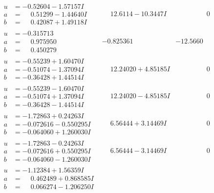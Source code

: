 \documentclass[1p]{elsarticle_modified}
\theoremstyle{definition}
\begin{document}
$$\begin{array}{c|c|c}
\begin{aligned}
u &= -0.52604 - 1.57157 I \\
a &= \phantom{-}0.51299 - 1.44640 I \\
b &= \phantom{-}0.42087 + 1.49118 I\end{aligned}
 & \phantom{-}12.6114 - 10.3447 I & \phantom{-0.000000 } 0 \\ \hline\begin{aligned}
u &= -0.315713\phantom{ +0.000000I} \\
a &= \phantom{-}0.975950\phantom{ +0.000000I} \\
b &= \phantom{-}0.450279\phantom{ +0.000000I}\end{aligned}
 & -0.825361\phantom{ +0.000000I} & -12.5660\phantom{ +0.000000I} \\ \hline\begin{aligned}
u &= -0.55239 + 1.60470 I \\
a &= -0.51074 - 1.37094 I \\
b &= -0.36428 + 1.44514 I\end{aligned}
 & \phantom{-}12.24020 + 4.85185 I & \phantom{-0.000000 } 0 \\ \hline\begin{aligned}
u &= -0.55239 - 1.60470 I \\
a &= -0.51074 + 1.37094 I \\
b &= -0.36428 - 1.44514 I\end{aligned}
 & \phantom{-}12.24020 - 4.85185 I & \phantom{-0.000000 } 0 \\ \hline\begin{aligned}
u &= -1.72863 + 0.24263 I \\
a &= -0.072616 - 0.550295 I \\
b &= -0.064060 + 1.260030 I\end{aligned}
 & \phantom{-}6.56444 + 3.14469 I & \phantom{-0.000000 } 0 \\ \hline\begin{aligned}
u &= -1.72863 - 0.24263 I \\
a &= -0.072616 + 0.550295 I \\
b &= -0.064060 - 1.260030 I\end{aligned}
 & \phantom{-}6.56444 - 3.14469 I & \phantom{-0.000000 } 0 \\ \hline\begin{aligned}
u &= -1.12384 + 1.56359 I \\
a &= \phantom{-}0.462489 + 0.868585 I \\
b &= \phantom{-}0.066274 - 1.206250 I\end{aligned}

\end{array}$$
\end{document}
